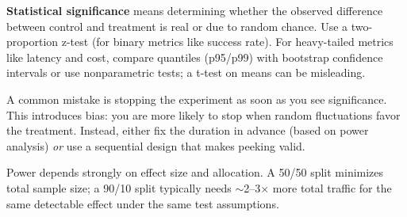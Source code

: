 \textbf{Statistical significance} means determining whether the observed difference between control and treatment is real or due to random chance. Use a two-proportion z-test (for binary metrics like success rate). For heavy-tailed metrics like latency and cost, compare quantiles (p95/p99) with bootstrap confidence intervals or use nonparametric tests; a t-test on means can be misleading.

A common mistake is stopping the experiment as soon as you see significance. This introduces bias: you are more likely to stop when random fluctuations favor the treatment. Instead, either fix the duration in advance (based on power analysis) \emph{or} use a sequential design that makes peeking valid.

Power depends strongly on effect size and allocation. A 50/50 split minimizes total sample size; a 90/10 split typically needs $\sim$2--3$\times$ more total traffic for the same detectable effect under the same test assumptions.

\vspace{1.5em}

